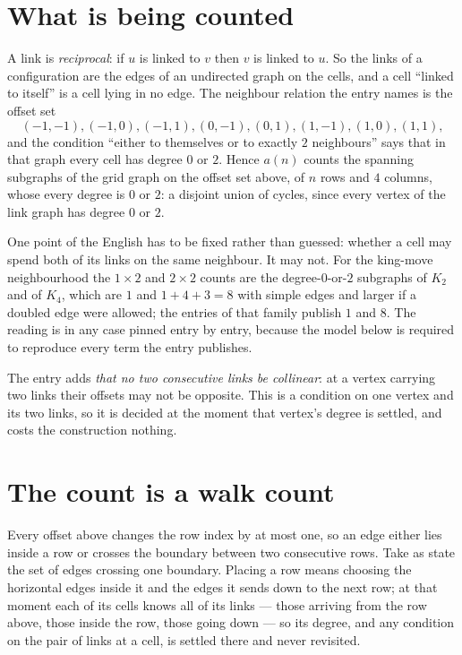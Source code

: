 \documentclass[11pt,a4paper]{article}
\theoremstyle{plain}
\theoremstyle{definition}
\begin{document}
\section{What is being counted}

A link is \emph{reciprocal}: if $u$ is linked to $v$ then $v$ is linked to $u$. So the links
of a configuration are the edges of an undirected graph on the cells, and a cell ``linked to
itself'' is a cell lying in no edge. The neighbour relation the entry names is the offset set
\[
(-1,-1), (-1,0), (-1,1), (0,-1), (0,1), (1,-1), (1,0), (1,1),
\]
and the condition ``either to themselves or to exactly $2$ neighbours'' says that in that
graph every cell has degree $0$ or $2$. Hence $a(n)$ counts the spanning subgraphs of the
grid graph on the offset set above, of $n$ rows and $4$ columns,
whose every degree is $0$ or $2$: a disjoint union of cycles, since every vertex of the link graph has degree $0$ or $2$.

One point of the English has to be fixed rather than guessed: whether a cell may spend both of
its links on the same neighbour. It may not. For the king-move neighbourhood the $1\times2$
and $2\times2$ counts are the degree-$0$-or-$2$ subgraphs of $K_2$ and of $K_4$, which are $1$
and $1+4+3=8$ with simple edges and larger if a doubled edge were allowed; the entries of that
family publish $1$ and $8$. The reading is in any case pinned entry by entry, because the
model below is required to reproduce every term the entry publishes.

The entry adds \emph{that no two consecutive links be collinear}: at a vertex carrying two
links their offsets may not be opposite. This is a condition on one vertex and its two links,
so it is decided at the moment that vertex's degree is settled, and costs the construction
nothing.

\section{The count is a walk count}

Every offset above changes the row index by at most one, so an edge either lies inside a row
or crosses the boundary between two consecutive rows. Take as state the set of edges crossing
one boundary. Placing a row means choosing the horizontal edges inside it and the edges it
sends down to the next row; at that moment each of its cells knows all of its links --- those
arriving from the row above, those inside the row, those going down --- so its degree, and any
condition on the pair of links at a cell, is settled there and never revisited.
\end{document}
